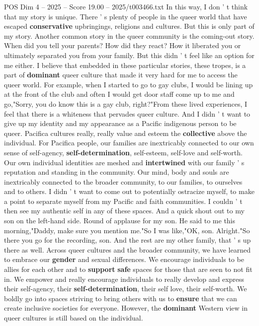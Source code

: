 \begin{textsample}{POS Dim 4 – 2025 – Score 19.00 – 2025/t003466.txt}
In this way, I don ' t think that my story is unique.
There ' s plenty of people in the queer world that have escaped \textbf{conservative} upbringings, religions and cultures.
But this is only part of my story.
Another common story in the queer community is the coming-out story.
When did you tell your parents?
How did they react?
How it liberated you or ultimately separated you from your family.
But this didn ' t feel like an option for me either.
I believe that embedded in these particular stories, these tropes, is a part of \textbf{dominant} queer culture that made it very hard for me to access the queer world.
For example, when I started to go to gay clubs, I would be lining up at the front of the club and often I would get door staff come up to me and go,"Sorry, you do know this is a gay club, right?"From these lived experiences, I feel that there is a whiteness that pervades queer culture.
And I didn ' t want to give up my identity and my appearance as a Pacific indigenous person to be queer.
Pacifica cultures really, really value and esteem the \textbf{collective} above the individual.
For Pacifica people, our families are inextricably connected to our own sense of self-agency, \textbf{self-determination}, self-esteem, self-love and self-worth.
Our own individual identities are meshed and \textbf{intertwined} with our family ' s reputation and standing in the community.
Our mind, body and souls are inextricably connected to the broader community, to our families, to ourselves and to others.
I didn ' t want to come out to potentially ostracize myself, to make a point to separate myself from my Pacific and faith communities.
I couldn ' t then see my authentic self in any of these spaces.
And a quick shout out to my son on the left-hand side.
Round of applause for my son.
He said to me this morning,"Daddy, make sure you mention me."So I was like,"OK, son.
Alright."So there you go for the recording, son.
And the rest are my other family, that ' s up there as well.
Across queer cultures and the broader community, we have learned to embrace our \textbf{gender} and sexual differences.
We encourage individuals to be allies for each other and to \textbf{support} \textbf{safe} spaces for those that are seen to not fit in.
We empower and really encourage individuals to really develop and express their self-agency, their \textbf{self-determination}, their self love, their self-worth.
We boldly go into spaces striving to bring others with us to \textbf{ensure} that we can create inclusive societies for everyone.
However, the \textbf{dominant} Western view in queer cultures is still based on the individual.

\end{textsample}
